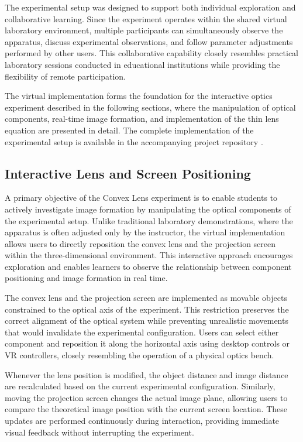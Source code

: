 The experimental setup was designed to support both individual exploration and collaborative learning. Since the experiment operates within the shared virtual laboratory environment, multiple participants can simultaneously observe the apparatus, discuss experimental observations, and follow parameter adjustments performed by other users. This collaborative capability closely resembles practical laboratory sessions conducted in educational institutions while providing the flexibility of remote participation.

The virtual implementation forms the foundation for the interactive optics experiment described in the following sections, where the manipulation of optical components, real-time image formation, and implementation of the thin lens equation are presented in detail. The complete implementation of the experimental setup is available in the accompanying project repository \cite{thesisRepo}.

\subsection{Interactive Lens and Screen Positioning}

A primary objective of the Convex Lens experiment is to enable students to actively investigate image formation by manipulating the optical components of the experimental setup. Unlike traditional laboratory demonstrations, where the apparatus is often adjusted only by the instructor, the virtual implementation allows users to directly reposition the convex lens and the projection screen within the three-dimensional environment. This interactive approach encourages exploration and enables learners to observe the relationship between component positioning and image formation in real time.

The convex lens and the projection screen are implemented as movable objects constrained to the optical axis of the experiment. This restriction preserves the correct alignment of the optical system while preventing unrealistic movements that would invalidate the experimental configuration. Users can select either component and reposition it along the horizontal axis using desktop controls or VR controllers, closely resembling the operation of a physical optics bench.

Whenever the lens position is modified, the object distance and image distance are recalculated based on the current experimental configuration. Similarly, moving the projection screen changes the actual image plane, allowing users to compare the theoretical image position with the current screen location. These updates are performed continuously during interaction, providing immediate visual feedback without interrupting the experiment.

